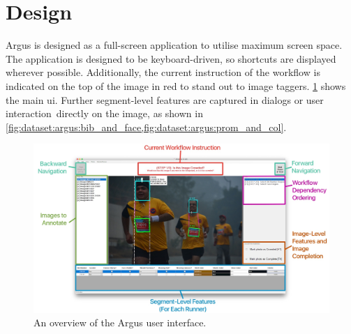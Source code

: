 \section{Design}

Argus is designed as a full-screen application to utilise maximum screen space. The application is designed to be keyboard-driven, so shortcuts are displayed wherever possible. Additionally, the current instruction of the workflow is indicated on the top of the image in red to stand out to image taggers. \cref{fig:dataset:argus:overview} shows the main \gls{ui}. Further segment-level features are captured in dialogs or user interaction directly on the image, as shown in \cref{fig:dataset:argus:bib_and_face,fig:dataset:argus:prom_and_col}.

\begin{figure}[h]
  \centering
  \includegraphics[width=\textwidth]{images/dataset/argus/argus_ui}
  \caption[An overview of the Argus user interface]{An overview of the Argus user interface.}
  \label{fig:dataset:argus:overview}
\end{figure}

